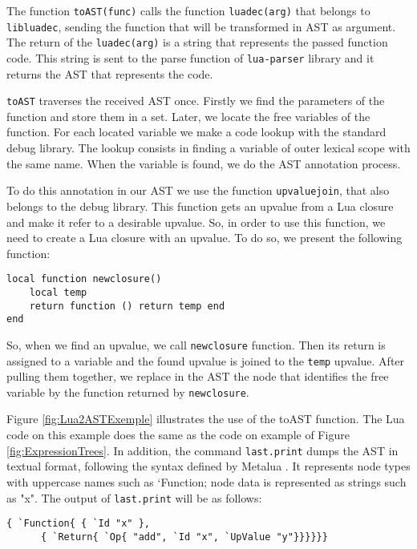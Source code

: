 \documentclass[english]{llncs}
\begin{document}
The function \texttt{toAST(func)} calls the function \texttt{luadec(arg)} that belongs to \texttt{libluadec}, sending the function that will be transformed in AST as argument.
The return of the \texttt{luadec(arg)} is a string that represents the passed function code.
This string is sent to the parse function of \texttt{lua-parser} library and it returns the AST that represents the code.

\texttt{toAST} traverses the received AST once.
Firstly we find the parameters of the function and store them in a set.
Later, we locate the free variables of the function.
For each located variable we make a code lookup with the standard debug library.
The lookup consists in finding a variable of outer lexical scope with the same name.
When the variable is found, we do the AST annotation process.

To do this annotation in our AST we use the function \texttt{upvaluejoin}, that also belongs to the debug library.
This function gets an upvalue from a Lua closure and make it refer to a desirable upvalue.
So, in order to use this function, we need to create a Lua closure with an upvalue.
To do so, we present the following function:


\begin{verbatim}
local function newclosure()
    local temp
    return function () return temp end
end
\end{verbatim}

So, when we find an upvalue, we call \texttt{newclosure} function.
Then its return is assigned to a variable and the found upvalue is joined to the \texttt{temp} upvalue.
After pulling them together, we replace in the AST the node that identifies the free variable by the function returned by \texttt{newclosure}.


Figure \ref{fig:Lua2ASTExemple} illustrates the use of the toAST function.
The Lua code on this example does the same as the code on example of Figure \ref{fig:ExpressionTrees}.
In addition, the command \texttt{last.print} dumps the AST in textual format, following the syntax defined by Metalua \cite{metalua}.
It represents node types with uppercase names such as `Function; node data is represented as strings such as "x".
The output of \texttt{last.print} will be as follows:
\begin{verbatim}
{ `Function{ { `Id "x" },
      { `Return{ `Op{ "add", `Id "x", `UpValue "y"}}}}}}
\end{verbatim}
\end{document}
